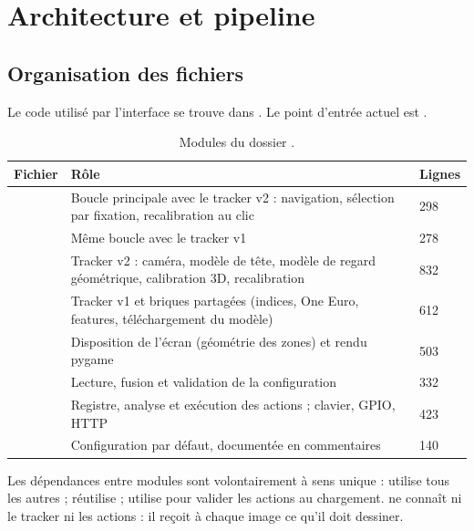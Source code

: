 \chapter{Architecture et pipeline}
\label{chap:archi}

\section{Organisation des fichiers}

Le code utilisé par l'interface se trouve dans . Le point d'entrée actuel est .

\begin{table}[H]
\centering\small
\begin{tabularx}{\textwidth}{@{}l L l@{}}
\toprule
Fichier & Rôle & Lignes \\
\midrule
{} & Boucle principale avec le tracker v2 : navigation, sélection par fixation, recalibration au clic & 298 \\
 & Même boucle avec le tracker v1 & 278 \\
 & Tracker v2 : caméra, modèle de tête, modèle de regard géométrique, calibration 3D, recalibration & 832 \\
 & Tracker v1 et briques partagées (indices, One Euro, features, téléchargement du modèle) & 612 \\
 & Disposition de l'écran (géométrie des zones) et rendu pygame & 503 \\
 & Lecture, fusion et validation de la configuration & 332 \\
 & Registre, analyse et exécution des actions ; clavier, GPIO, HTTP & 423 \\
 & Configuration par défaut, documentée en commentaires & 140 \\
\bottomrule
\end{tabularx}
\caption{Modules du dossier .}
\end{table}

Les dépendances entre modules sont volontairement à sens unique :  utilise tous les autres ;  réutilise  ;  utilise  pour valider les actions au chargement.  ne connaît ni le tracker ni les actions : il reçoit à chaque image ce qu'il doit dessiner.

